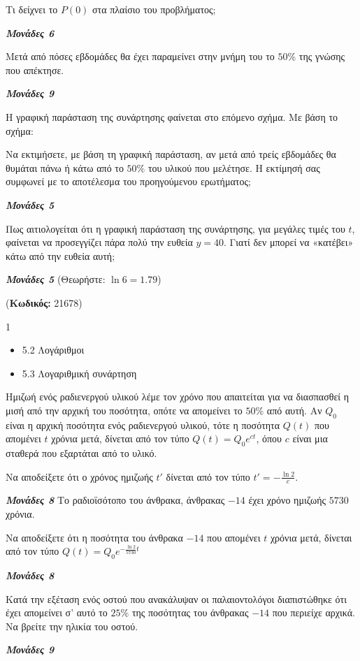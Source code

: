 \documentclass[11pt,a4paper,twoside]{book}
\newcounter{askhsh}[chapter]
\renewcommand{\theaskhsh}{
	\bf{\titlefont{\Large{\thechapter}}.\arabic{askhsh}}
}
\newcommand{\Askhsh}[2]{\refstepcounter{askhsh}{\vspace{4mm}\titlefont{{\large Άσκηση}\theaskhsh} - \textcolor{maincolor}{ΘEMA #2}} ({\small{\textbf{Κωδικός:} #1}})}{}
\newenvironment{ylh}[1]{\raggedright
\begin{tcolorbox}[
breakable,
halign=flush left,
enhanced standard,
titlerule=0pt,
toptitle=1mm,
toprule=0pt, 
rightrule=0pt, 
bottomrule=0pt,
title={\titlefont{Ύλη άσκησης}},
colback=white,
opacityback=0,
left=1mm,
top=0mm,
bottom=2mm,
boxrule=0pt,
colframe=white,
borderline north={0.2mm}{0pt}{maincolor},
borderline south={0.2mm}{0pt}{maincolor},
leftrule=2mm,
sharp corners,
coltitle=black
]
\begin{multicols}{#1}
\begin{itemize}[leftmargin=5mm, itemsep=0mm, label=\textcolor{maincolor}{{\small\faBook}}]
}{
\end{itemize}
\end{multicols}
\end{tcolorbox}
}
\newcommand{\monades}[1]{
\hspace*{\fill}
\textbf{\textit{\textcolor{maincolor}{Μονάδες #1}}}}
\begin{document}
\begin{alist}
\item Τι δείχνει το $P(0)$ στα πλαίσιο του προβλήματος;
\monades{6}
\item Μετά από πόσες εβδομάδες θα έχει παραμείνει στην μνήμη του το $50\%$ της γνώσης που απέκτησε.
\monades{9}
\begin{center}
\end{center}
Η γραφική παράσταση της συνάρτησης φαίνεται στο επόμενο σχήμα. Με βάση το σχήμα:
\item Να εκτιμήσετε, με βάση τη γραφική παράσταση, αν μετά από τρείς εβδομάδες θα θυμάται πάνω ή κάτω από το $50\%$ του υλικού που μελέτησε. Η εκτίμησή σας συμφωνεί με το αποτέλεσμα του προηγούμενου ερωτήματος;
\monades{5}
\item Πως αιτιολογείται ότι η γραφική παράσταση της συνάρτησης, για μεγάλες τιμές του $t$, φαίνεται να προσεγγίζει πάρα πολύ την ευθεία $y = 40$. Γιατί δεν μπορεί να «κατέβει» κάτω από την ευθεία αυτή;
\monades{5}
(Θεωρήστε: $\ln 6 = 1.79$)
\end{alist}
\Askhsh{21678}{4}
\begin{ylh}{1}
\item 5.2 Λογάριθμοι
\item 5.3 Λογαριθμική συνάρτηση
\end{ylh}
Ημιζωή ενός ραδιενεργού υλικού λέμε τον χρόνο που απαιτείται για να διασπασθεί η μισή από την αρχική του ποσότητα, οπότε να απομείνει το $50\%$ από αυτή.
Αν $Q_0$ είναι η αρχική ποσότητα ενός ραδιενεργού υλικού, τότε η ποσότητα $Q(t)$ που απομένει $t$ χρόνια μετά, δίνεται από τον τύπο $Q(t) = Q_0 e^{ct}$, όπου $c$ είναι μια σταθερά που εξαρτάται από το υλικό.
\begin{alist}
\item Να αποδείξετε ότι ο χρόνος ημιζωής $t'$ δίνεται από τον τύπο $t' = -\frac{\ln 2}{c}$.
\monades{8}
Το ραδιοϊσότοπο του άνθρακα, άνθρακας $-14$ έχει χρόνο ημιζωής $5730$ χρόνια.
\item Να αποδείξετε ότι η ποσότητα του άνθρακα $-14$ που απομένει $t$ χρόνια μετά, δίνεται από τον τύπο
$Q(t) = Q_0 e^{-\frac{\ln 2}{5730} t}$
\monades{8}
\item Κατά την εξέταση ενός οστού που ανακάλυψαν οι παλαιοντολόγοι διαπιστώθηκε ότι έχει απομείνει σ' αυτό το $25\%$ της ποσότητας του άνθρακας $-14$ που περιείχε αρχικά. Να βρείτε την ηλικία του οστού.
\monades{9}
\end{alist}
\end{document}
